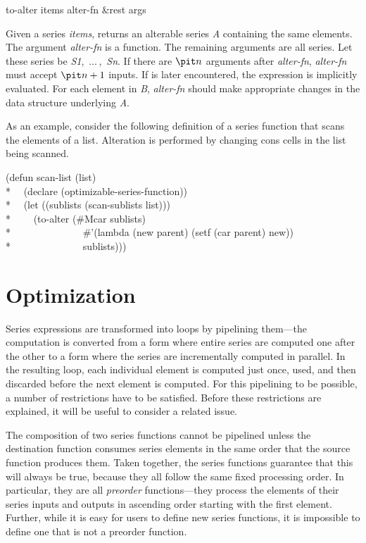\begin{defun}[Function]
to-alter items alter-fn &rest args

Given a series {\it items},  returns an alterable series {\it
A} containing the same elements.  The argument {\it alter-fn} is a
function.  The remaining arguments are all series.  Let these series be
{\it S1},~$\ldots\,$,~{\it Sn}.  If there are ${\it n}$ arguments after {\it alter-fn},
{\it alter-fn} must accept ${\it n}+1$ inputs.  If  is
later encountered, the expression
 is implicitly
evaluated.  For each
element in {\it B}, {\it alter-fn} should make appropriate changes in the
data structure underlying {\it A}.

As an example, consider the following definition of a series function
that scans the elements of a list.  Alteration is performed by
changing cons cells in the list being scanned.
\begin{lisp}
(defun scan-list (list) \\*
~~(declare (optimizable-series-function)) \\*
~~(let ((sublists (scan-sublists list))) \\*
~~~~(to-alter (\#Mcar sublists) \\*
~~~~~~~~~~~~~~\#'(lambda (new parent) (setf (car parent) new)) \\*
~~~~~~~~~~~~~~sublists)))
\end{lisp}
\end{defun}

\section{Optimization}\label{SERIES-E-SECTION}

Series expressions are transformed into loops by pipelining them---the
computation is converted from a form where entire series are computed one
after the other to a form where the series are incrementally computed in
parallel.  In the resulting loop, each individual element is computed just
once, used, and then discarded before the next element is computed.  For
this pipelining to be possible, a number of restrictions have to be
satisfied.  Before these restrictions are explained, it will be useful to consider
a related issue.

The composition of two series functions cannot be pipelined unless the
destination function consumes series elements in the same order that the source
function produces them.  Taken together, the series functions guarantee
that this will always be true, because they all follow the same fixed
processing order.  In particular, they are all {\it preorder\/}
functions---they process the elements of their series inputs and outputs in
ascending order starting with the first element.  Further, while it is easy
for users to define new series functions, it is impossible to define one
that is not a preorder function.

